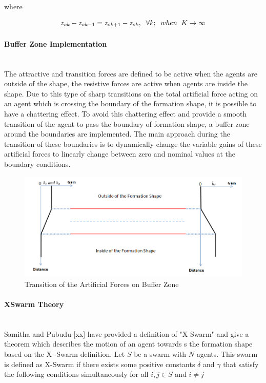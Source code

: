 where

\begin{equation}
z_{ok}- z_{ok -1} = z_{ok+1} - z_{ok}, \hspace{0.2cm}  \forall k ;  \hspace{0.2cm} when  \hspace{0.2cm} K \to\infty
\end{equation}
			
\paragraph{Buffer Zone Implementation}\hspace{0pt} \\
The attractive and transition forces are defined to be active when the agents are outside of the shape, the resistive forces are active when agents are inside the shape. Due to this type of sharp transitions on the total artificial force acting on an agent which is crossing the boundary of the formation shape, it is possible to have a chattering effect. To avoid this chattering effect and provide a smooth transition of the agent to pass the boundary of formation shape, a buffer zone around the boundaries are implemented. The main approach during the transition of these boundaries is to dynamically change the variable gains of these artificial forces to linearly change between zero and nominal values at the boundary conditions. 
     
\begin{figure}[H]
\caption{Transition of the Artificial Forces on Buffer Zone}
\centering
\includegraphics[scale = 0.50]{buffer_zone}
\end{figure}
			
			
\paragraph{XSwarm Theory}\hspace{0pt} \\
Samitha and Pubudu [xx] have provided a definition of "X-Swarm" and give a theorem which describes the motion of an agent towards s the formation shape based on the X -Swarm definition. Let $S$ be a swarm with $N$ agents. This swarm is defined as X-Swarm if there exists some positive constants $\delta$ and  $ \gamma$ that satisfy the following conditions simultaneously for all $i,j \in S$ and $i \neq j$
			
